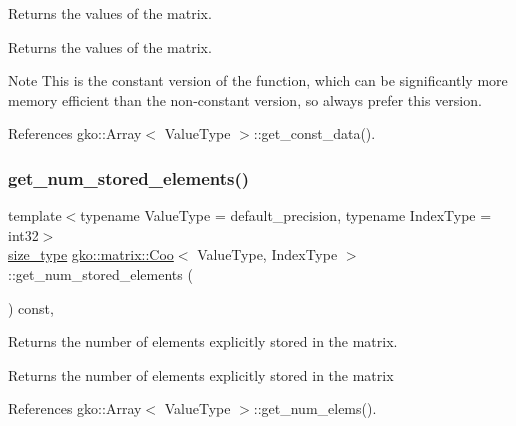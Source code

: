 Returns the values of the matrix. 

\begin{DoxyReturn}{Returns}
the values of the matrix.
\end{DoxyReturn}
\begin{DoxyNote}{Note}
This is the constant version of the function, which can be significantly more memory efficient than the non-\/constant version, so always prefer this version. 
\end{DoxyNote}


References gko\+::\+Array$<$ Value\+Type $>$\+::get\+\_\+const\+\_\+data().

\mbox{\label{classgko_1_1matrix_1_1Coo_aece531e069f8490fd8d2b3ab58f72d09}} 
\subsubsection{\texorpdfstring{get\+\_\+num\+\_\+stored\+\_\+elements()}{get\_num\_stored\_elements()}}
{\footnotesize\ttfamily template$<$typename Value\+Type = default\+\_\+precision, typename Index\+Type = int32$>$ \\
\hyperlink{namespacegko_a6e5c95df0ae4e47aab2f604a22d98ee7}{size\+\_\+type} \hyperlink{classgko_1_1matrix_1_1Coo}{gko\+::matrix\+::\+Coo}$<$ Value\+Type, Index\+Type $>$\+::get\+\_\+num\+\_\+stored\+\_\+elements (\begin{DoxyParamCaption}{ }\end{DoxyParamCaption}) const\hspace{0.3cm}{\ttfamily [inline]}, {\ttfamily [noexcept]}}



Returns the number of elements explicitly stored in the matrix. 

\begin{DoxyReturn}{Returns}
the number of elements explicitly stored in the matrix 
\end{DoxyReturn}


References gko\+::\+Array$<$ Value\+Type $>$\+::get\+\_\+num\+\_\+elems().

\mbox{\label{classgko_1_1matrix_1_1Coo_a57aa0f7b701020c4322a3aed63d8a25d}} 
